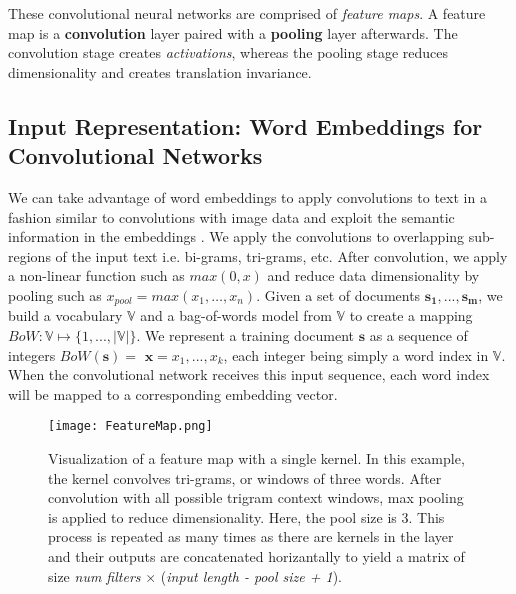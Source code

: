 These convolutional neural networks are comprised of \textit{feature maps}. A feature map is a \textbf{convolution} layer paired with a
\textbf{pooling} layer afterwards. The convolution stage creates \textit{activations}, whereas the pooling stage
reduces dimensionality and creates translation invariance.


\subsection{Input Representation: Word Embeddings for Convolutional Networks}
We can take advantage of word embeddings to apply convolutions to text in a fashion similar to convolutions with
image data and exploit the semantic information in the embeddings \cite{kim2014convolutional}. We apply the convolutions to overlapping sub-regions of the input text i.e. bi-grams, tri-grams, etc.
After convolution, we apply a non-linear function such as $max(0,x)$ and reduce data dimensionality
by pooling such as $x_{pool} = max(x_1,\dots,x_n)$.
Given a set of documents $\bm{s_1},...,\bm{s_m}$, we build a vocabulary $\mathbb{V}$ and a bag-of-words model from $\mathbb{V}$ to create a mapping $BoW:\mathbb{V} \mapsto \{1,...,|\mathbb{V}|\}$.
We represent a training document $\bm{s}$ as a sequence of integers $BoW(\bm{s})=$ $\bm{x} = x_1,...,x_k$, each integer being simply a word index
in $\mathbb{V}$. When the convolutional network receives this input sequence, each word index will be mapped to a corresponding embedding vector.

\begin{figure}[H]
\centering
\texttt{[image: FeatureMap.png]}
\caption{Visualization of a feature map with a single kernel. In this example, the kernel convolves tri-grams, or windows of three words.
After convolution with all possible trigram context windows, max pooling is applied to reduce dimensionality.
Here, the pool size is 3. This process is repeated as many times as there are kernels in the layer and their outputs are
concatenated horizantally to yield a matrix of size \textit{num filters} $\times$ (\textit{input length - pool size + 1}).}
\label{fig:convolution}
\end{figure}
